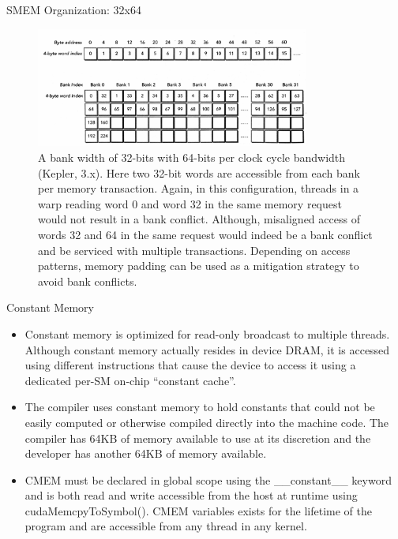 \documentclass[handout]{beamer}
\begin{document}
\begin{frame}{SMEM Organization: 32x64}
\begin{figure}
\begin{center}
\includegraphics[width=9cm]{../media/banks64.pdf}
\caption{A bank width of 32-bits with 64-bits per clock cycle bandwidth (Kepler, 3.x).  Here two 32-bit words are accessible from each bank per memory transaction.  Again, in this configuration, threads in a warp reading word 0 and word 32 in the same memory request would not result in a bank conflict.  Although, misaligned access of words 32 and 64 in the same request would indeed be a bank conflict and be serviced with multiple transactions.  Depending on access patterns, memory padding can be used as a mitigation strategy to avoid bank conflicts.}
\end{center}
\end{figure}
\end{frame}

\begin{frame}{Constant Memory}
\begin{itemize}
	\item<1->Constant memory is optimized for read-only broadcast to multiple threads.  Although constant memory actually resides in device DRAM, it is accessed using different instructions that cause the device to access it using a dedicated per-SM on-chip ``constant cache''.
	\item<1->The compiler uses constant memory to hold constants that could not be easily computed or otherwise compiled directly into the machine code.  The compiler has 64KB of memory available to use at its discretion and the developer has another 64KB of memory available.
	\item<1->CMEM must be declared in global scope using the {\selectfont \_\_constant\_\_} keyword and is both read and write accessible from the host at runtime using {\selectfont cudaMemcpyToSymbol()}.  CMEM variables exists for the lifetime of the program and are accessible from any thread in any kernel.  
\end{itemize}
\end{frame}
\end{document}
